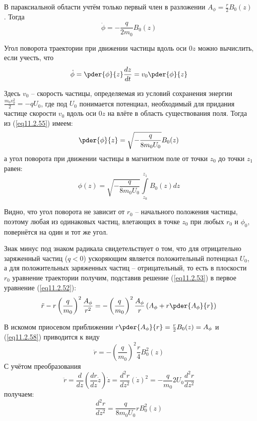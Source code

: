 В параксиальной области учтём только первый член в разложении 
\( A_\phi = \frac{r}{2} B_0(z)\). Тогда
\[
	\dot{\phi} = -\frac{q}{2m_0}B_0(z)
\]

Угол поворота траектории при движении частицы вдоль оси \( 0z \) можно 
вычислить, если учесть, что 
\[
	\dot{\phi} = \pder{\phi}{z}\frac{dz}{dt} = v_0 \pder{\phi}{z}
\]

Здесь \( v_0 \) -- скорость частицы, определяемая из условий сохранения 
энергии \( \frac{m_0 v_0^2}{2} = -qU_0 \), где под \( U_0 \) понимается 
потенциал, необходимый для придания частице скорости \( v_0 \) вдоль оси 
\( 0z \) на влёте в область существования поля. Тогда из (\ref{eq11.2.55}) 
имеем:
\[
	\pder{\phi}{z} = \sqrt{-\frac{q}{8m_0 U_0}} B_0(z)
\]
а угол поворота при движении частицы в магнитном поле от точки \( z_0 \) до 
точки \( z_1 \) равен:
\[
	\phi(z) = \sqrt{-\frac{q}{8m_0 U_0}} \int\limits_{z_0}^{z_1} B_0(z) dz
\]

Видно, что угол поворота не зависит от \( r_0 \) -- начального положения 
частицы, поэтому любая из одинаковых частиц, влетающих в точке \( z_0 \) при 
любых \( r_0 \) и \( \phi_0 \), повернётся на один и тот же угол. 

Знак минус под знаком радикала свидетельствует о том, что для отрицательно 
заряженный частиц (\( q < 0 \)) ускоряющим является положительный потенциал 
\( U_0 \), а для положительных заряженных частиц -- отрицательный, то есть в 
плоскости \( r_0 \) уравнение траектории получим, подставив решение 
(\ref{eq11.2.53}) в первое уравнение (\ref{eq11.2.52}):
\begin{equation}
	\ddot{r} - r\left( \frac{q}{m_0}\right)^2 \frac{A_\phi}{r^2} = 
		-\left( \frac{q}{m_0} \right)^2 \frac{A_\phi}{r}
		\left( A_\phi + r\pder{A_\phi}{r} \right)
	\label{eq11.2.58}
\end{equation}

В искомом приосевом приближении 
\( r\pder{A_\phi}{r} = \frac{r}{2} B_0(z) = A_\phi \) и (\ref{eq11.2.58}) 
приводится к виду
\[
	\ddot{r} = -\left( \frac{q}{m_0} \right)^2 \frac{r}{4} B_0^2(z)
\]
С учётом преобразования
\[
	\ddot{r} = \frac{d}{dz}\left( \frac{dr}{dz}\dot{z} \right)\dot{z} = 
		\frac{d^2 r}{dz^2}(\dot{z})^2 = -\frac{q}{m_0}2U_0\frac{d^2 r}{dz^2}
\]
получаем:
\[
	\frac{d^2 r}{dz^2} = \frac{q}{8m_0 U_0}rB_0^2(z)
\]
